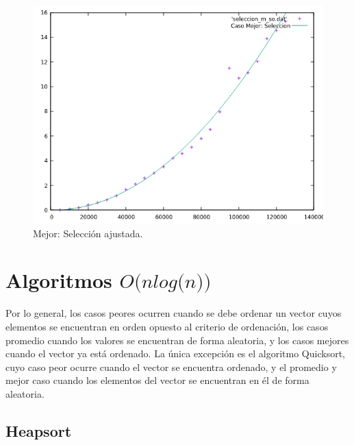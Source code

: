 \documentclass[a4paper,12pt,twoside]{article} %
\begin{document}
\begin{itemize}
\begin{figure}[h]
\begin{center}
  	\includegraphics[scale=0.8]{seleccion_m_so_a.png}
  	\caption{Mejor: Selección ajustada.}
  	
  \end{center}
\end{figure}
	
	
	\end{itemize}
	
	
	
	
\newpage
\section{Algoritmos $\textit{O(nlog(n))}$}

Por lo general, los casos peores ocurren cuando se debe ordenar un vector cuyos elementos se encuentran en orden opuesto al criterio de ordenación, los casos promedio cuando los valores se encuentran de forma aleatoria, y los casos mejores cuando el vector ya está ordenado. La única excepción es el algoritmo Quicksort, cuyo caso peor ocurre cuando el vector se encuentra ordenado, y el promedio y mejor caso cuando los elementos del vector se encuentran en él de forma aleatoria.
\newpage

\subsection{Heapsort}
\end{document}
